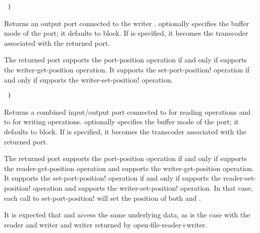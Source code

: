 \begin{entry}{%
{\tt\hspace*{4em} )}}
   
Returns an output port connected to the writer .
 optionally specifies the buffer mode of the port; it
defaults to {\cf block}.
If  is specified, it becomes the transcoder associated
with the returned port.

The returned port supports the {\cf port-position} operation if and
only if  supports the {\cf writer-get-position} operation.
It supports the {\cf set-port-position!} operation if and
only if  supports the {\cf writer-set-position!} operation.
\end{entry}

\begin{entry}{%
{\tt\hspace*{4em}   )}}

Returns a combined input/output port connected to  for
reading operations and to  for writing operations. 
 optionally specifies the buffer mode of the port; it
defaults to {\cf block}.
If  is specified, it becomes the transcoder associated
with the returned port.

The returned port supports the {\cf port-position} operation if and
only if  supports the {\cf reader-get-position} operation and
 supports the {\cf writer-get-position} operation.
It supports the {\cf set-port-position!} operation if and
only if  supports the {\cf reader-set-position!} operation and
 supports the {\cf writer-set-position!} operation.
In that case, each call to {\cf set-port-position!} will set the
position of both  and .

\begin{note}
  It is expected that  and  access the same
  underlying data, as is the case with the reader and writer and
  writer returned by {\cf open-file-reader+writer}.
\end{note}
\end{entry}

